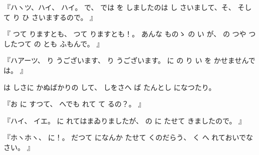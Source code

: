 『ハヽツ、ハイ、
%
ハイ。
%
で、
%
では
を
しましたのは
し
さいまして、そ、
%
そして
り
ひ
さいまするので。
』

『
つて
りますとも、
%
つて
りますとも！。
%
あんな
ものゝ
の
い
が、
%
の
つや
つ
したつて
の
とも
ふもんで。
』

『ハアーツ、
%
り
うございます、
%
り
うございます。
%
に
の
り
い
を
かせませんでは。
』

は
しさに
かぬばかりの
して、
%
しをさへ
ば
たんとし
になつたり。

『お
に
すつて、
%
へでも
れて
て
るの？。
』

『ハイ、
%
イエ。
%
に
れてはまゐりましたが、
%
の
に
たせて
きましたので。
』

『ホヽホヽ、
%
に！。%
%
だつて
になんか
たせて
くのだらう、
%
く
へ
れておいでなさい。
』
